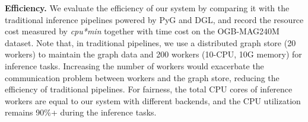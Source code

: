 \documentclass[conference]{IEEEtran}
\begin{document}
\textbf{Efficiency.}
We evaluate the efficiency of our system by comparing it with the traditional inference pipelines powered by PyG and DGL, and record the resource cost measured by \emph{cpu*min} together with time cost on the OGB-MAG240M dataset.
Note that, in traditional pipelines, we use a distributed graph store (20 workers) to maintain the graph data and 200 workers (10-CPU, 10G memory) for inference tasks.
Increasing the number of workers would exacerbate the communication problem between workers and the graph store, reducing the efficiency of traditional pipelines.
For fairness, the total CPU cores of inference workers are equal to our system with different backends, and the CPU utilization remains 90\%+ during the inference tasks.


% 
\end{document}
